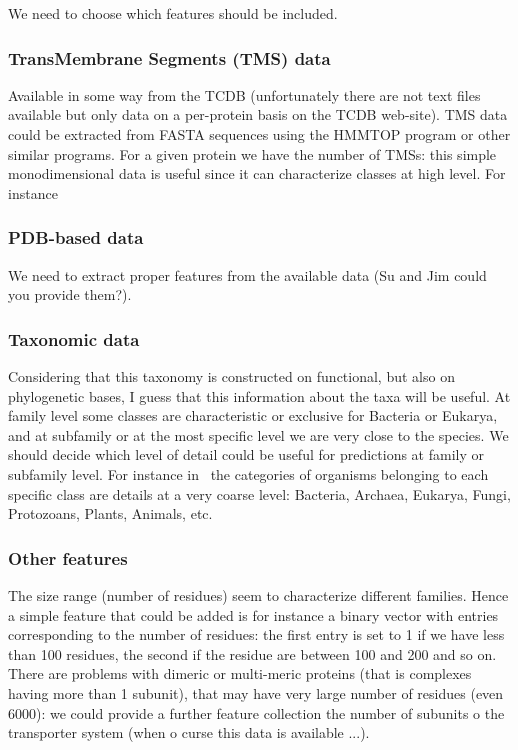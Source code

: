 \documentclass[english]{article}
\begin{document}
We need to choose which features should be included.

\subsubsection{TransMembrane Segments (TMS) data}
Available in some way from the TCDB (unfortunately there are not text files available but only data on a per-protein basis on the TCDB web-site).
TMS data could be extracted from FASTA sequences using the HMMTOP program or other similar programs. 
For a given protein we have the number of TMSs: this simple monodimensional data is useful since it can characterize classes at high level. For instance



\subsubsection{PDB-based data}

We need to extract proper  features from the available data (Su and Jim could you provide them?).


\subsubsection{Taxonomic data}

Considering that this taxonomy is constructed on functional, but also on phylogenetic bases, I guess that this information about the taxa will be useful. At family level some classes are characteristic or exclusive for Bacteria or Eukarya, and at subfamily or at the most specific level we are very close to the species. We should decide which level of detail could be useful for predictions at family or subfamily level. For instance in~\cite{Saier00} the categories of organisms belonging to each specific class are details at a very coarse level: Bacteria, Archaea, Eukarya, Fungi, Protozoans, Plants, Animals, etc.


\subsubsection{Other features}
The size range (number of residues) seem to characterize different families. Hence a simple feature that could be added is for instance a binary vector with entries corresponding to the number of residues: the first entry is set to 1 if we have less than 100 residues, the second if the residue are between 100 and 200 and so on. There are problems with dimeric or multi-meric proteins (that is complexes having more than 1 subunit), that may have very large number of residues (even 6000): we could provide a further feature collection the number of subunits o the transporter  system (when o curse this data is available ...).
\end{document}
